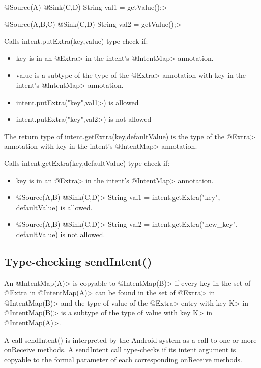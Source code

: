 \<@Source({A}) @Sink({C,D}) String val1 = getValue();>


\<@Source({A,B,C}) @Sink({C,D}) String val2 = getValue();>



%
Calls intent.putExtra(key,value) type-check if:
%
\begin{itemize}
\item
 key is in an \<@Extra> in the intent's \<@IntentMap> annotation.
\item
 value is a subtype of the type of the \<@Extra> annotation with key in the
	intent's \<@IntentMap> annotation. 


\end{itemize}

	
\begin{itemize}
\item
intent.putExtra("key",\<val1>) is allowed 
\item
intent.putExtra("key",\<val2>) is not allowed

\end{itemize}


The return type of intent.getExtra(key,defaultValue) is the type of the \<@Extra>
annotation with key in the intent's \<@IntentMap> annotation.
%

Calls intent.getExtra(key,defaultValue) type-check if:
\begin{itemize}
\item
key is in an \<@Extra> in the intent's \<@IntentMap> annotation.
\end{itemize}
		
\begin{itemize}
\item
	\<@Source({A,B}) @Sink({C,D})> String val1 = intent.getExtra("key", defaultValue) is allowed. 
\item
    \<@Source({A,B}) @Sink({C,D})> String val2 = intent.getExtra("new\_key",
	defaultValue) is not allowed. 
\end{itemize}

\subsection{Type-checking sendIntent()}
An \<@IntentMap(A)> is copyable to \<@IntentMap(B)> if every key in the set of
@Extra in \<@IntentMap(A)> can be found in the set of \<@Extra> in
\<@IntentMap(B)> and the type of value of the \<@Extra> entry with key \<K> in
\<@IntentMap(B)> is a subtype of the type of value with key \<K> in
\<@IntentMap(A)>.


A call sendIntent() is interpreted by the Android system as a call to one or
more onReceive methods. A sendIntent call type-checks if its intent argument is
copyable to the formal parameter of each corresponding onReceive methods.


